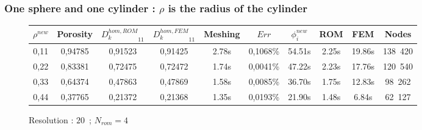 {\subsubsection{One sphere and one cylinder : $\rho$ is the radius of the cylinder}

\begin{comment}
\begin{figure}[H]%
%
\begin{center}
\begin{tabular}{|c|c||c|c||c|c||c|c||c||c|}
\hline
\rowcolor{lightgray} $\rho^{new}$&Porosity&${D_k^{hom,ROM}}_{11}$&${D_k^{hom,FEM}}_{11}$&Meshing&$Err$&$\phi_i^{new}$&ROM&FEM&Nodes\\
\hline
0,11&0,&0,&0,&s&0,\%&s&s&s&\\
\hline
0,22&0,&0,&0,&s&0,\%&s&s&s&\\
\hline
0,33&0,&0,&0,&s&0,\%&s&s&s&\\
\hline
0,44&0,&0,&0,&s&0,\%&s&s&s&\\
\hline
\end{tabular}
\end{center}
\caption{Resolution : $10$\ ; $N_{rom}=5$}
%
\end{figure}
\end{comment}

\begin{figure}[H]%
%
\begin{center}
\begin{tabular}{|c|c||c|c||c|c||c|c||c||c|}
\hline
\rowcolor{lightgray} $\rho^{new}$&Porosity&${D_k^{hom,ROM}}_{11}$&${D_k^{hom,FEM}}_{11}$&Meshing&$Err$&$\phi_i^{new}$&ROM&FEM&Nodes\\
\hline
0,11&0,94785&0,91523&0,91425&2.78s&0,1068\%&54.51s&2.25s&19.86s&138\ 420\\
\hline
0,22&0,83381&0,72475&0,72472&1.74s&0,0041\%&47.22s&2.23s&17.76s&120\ 540\\
\hline
0,33&0,64374&0,47863&0,47869&1.58s&0,0085\%&36.70s&1.75s&12.83s&98\ 262\\
\hline
0,44&0,37765&0,21372&0,21368&1.35s&0,0193\%&21.90s&1.48s&6.84s&62\ 127\\
\hline
\end{tabular}
\end{center}
\caption{Resolution : $20$\ ; $N_{rom}=4$}
%
\end{figure}

}
